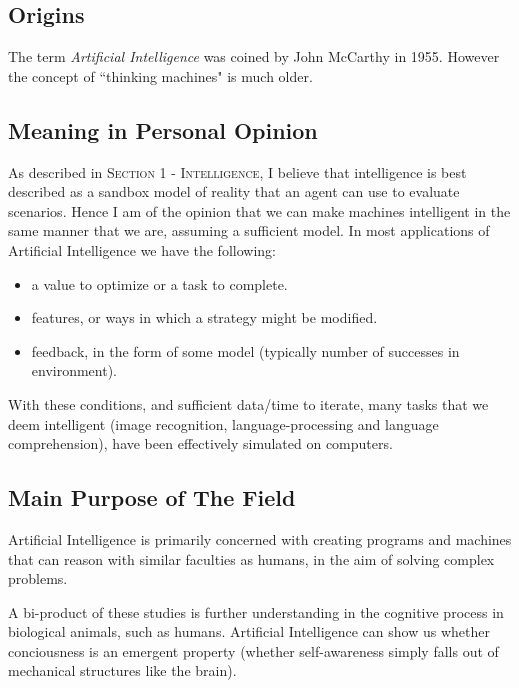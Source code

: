 \documentclass[10pt,a4paper]{article}
\begin{document}
		 	\subsection{Origins}
				The term \textsl{Artificial Intelligence} was coined by John McCarthy in 1955. However the concept of ``thinking machines" is much older.
		
		
			\subsection{Meaning in Personal Opinion}
		
				
				
				As described in \textsc{Section 1 - Intelligence}, I believe that intelligence is best described as a sandbox model of reality that an agent can use to evaluate scenarios. Hence I am of the opinion that we can make machines intelligent in the same manner that we are, assuming a sufficient model. In most applications of Artificial Intelligence we have the following: 
				
				\begin{itemize}
					\item a value to optimize or a task to complete.
					\item features, or ways in which a strategy might be modified.
					\item feedback, in the form of some model (typically number of successes in environment).
				\end{itemize}
				
				With these conditions, and sufficient data/time to iterate, many tasks that we deem intelligent (image recognition, language-processing and language comprehension), have been effectively simulated on computers.
		
			\subsection{Main Purpose of The Field}
		
				Artificial Intelligence is primarily concerned with creating programs and machines that can reason with similar faculties as humans, in the aim of solving complex problems. 
				
				A bi-product of these studies is further understanding in the cognitive process in biological animals, such as humans. Artificial Intelligence can show us whether conciousness is an emergent property (whether self-awareness simply falls out of mechanical structures like the brain).
		
\end{document}
